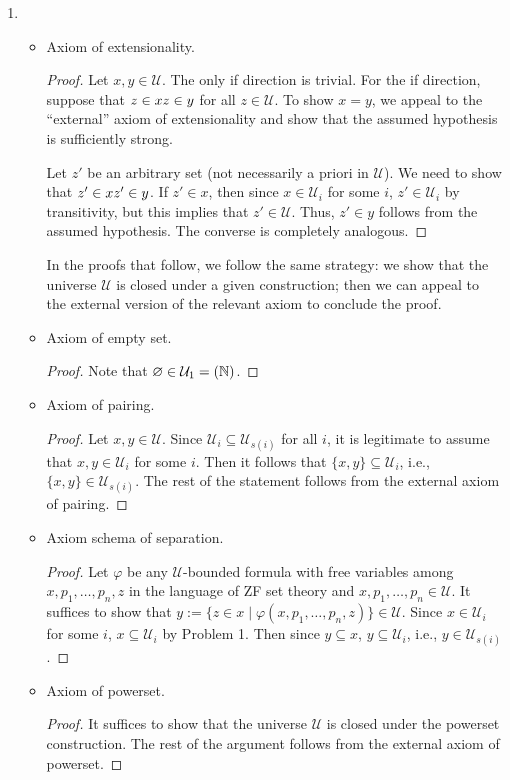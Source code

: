 \documentclass[a4paper]{article}
\newcommand{\N}{\mathbb{N}}
\let\P\relax
\newcommand{\P}{\mathcal{P}}
\newcommand{\U}{\mathcal{U}}
\let\iff\relax
\newcommand{\iff}{\Leftrightarrow}
\begin{document}
\begin{enumerate}
\item
  \begin{itemize}
  \item Axiom of extensionality.
    \begin{proof}
      Let $x,y \in \U$.
      The only if direction is trivial.
      For the if direction, suppose that $z \in x \iff z \in y$ for all $z \in \U$.
      To show $x = y$, we appeal to the ``external'' axiom of extensionality and show that the assumed hypothesis is sufficiently strong.

      Let $z'$ be an arbitrary set (not necessarily a priori in $\U$).
      We need to show that $z' \in x \iff z' \in y$.
      If $z' \in x$, then since $x \in \U_{i}$ for some $i$, $z' \in \U_{i}$ by transitivity, but this implies that $z' \in \U$.
      Thus, $z' \in y$ follows from the assumed hypothesis.
      The converse is completely analogous.
    \end{proof}
    In the proofs that follow, we follow the same strategy: we show that the universe $\U$ is closed under a given construction; then we can appeal to the external version of the relevant axiom to conclude the proof.
  \item Axiom of empty set.
    \begin{proof}
      Note that $\varnothing \in \U_{1} = \P(\N)$.
    \end{proof}
  \item Axiom of pairing.
    \begin{proof}
      Let $x,y \in \U$.
      Since $\U_{i} \subseteq \U_{s(i)}$ for all $i$, it is legitimate to assume that $x,y \in \U_{i}$ for some $i$.
      Then it follows that $\{x,y\} \subseteq \U_{i}$, i.e., $\{x,y\} \in \U_{s(i)}$.
      The rest of the statement follows from the external axiom of pairing.
    \end{proof}
  \item Axiom schema of separation.
    \begin{proof}
      Let $\varphi$ be any $\U$-bounded formula with free variables among $x,p_{1},\ldots,p_{n},z$ in the language of ZF set theory and $x,p_{1},\ldots,p_{n} \in \U$.
      It suffices to show that $y := \{z \in x \mid \varphi(x,p_{1},\ldots,p_{n},z)\} \in \U$.
      Since $x \in \U_{i}$ for some $i$, $x \subseteq \U_{i}$ by Problem 1.
      Then since $y \subseteq x$, $y \subseteq \U_{i}$, i.e., $y \in \U_{s(i)}$.
    \end{proof}
  \item Axiom of powerset.
    \begin{proof}
      It suffices to show that the universe $\U$ is closed under the powerset construction.
      The rest of the argument follows from the external axiom of powerset.


\end{proof}
\end{itemize}
\end{enumerate}
\end{document}
